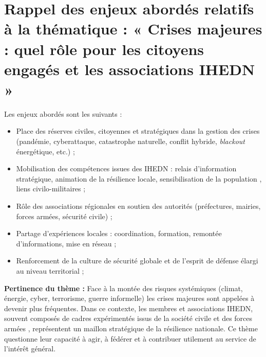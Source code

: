 \documentclass[12pt,a4paper]{article}
\begin{document}
\newpage

\section{Rappel des enjeux abordés relatifs à la thématique : « Crises majeures : quel rôle pour les citoyens engagés et les associations IHEDN »}

Les enjeux abordés sont les suivants :

\begin{itemize}
\item Place des réserves civiles, citoyennes et stratégiques dans la gestion des crises (pandémie, cyberattaque, catastrophe naturelle, conflit hybride, \textit{blackout} énergétique, etc.) ;
\item Mobilisation  des compétences issues des IHEDN : relais d'information stratégique, animation de la résilience locale, sensibilisation de la population , liens civilo-militaires ;
\item Rôle des associations régionales en soutien des autorités (préfectures, mairies, forces armées, sécurité civile) ;
\item Partage d'expériences locales : coordination, formation, remontée d'informations, mise en réseau  ;
\item Renforcement de la culture de sécurité globale et de l'esprit de défense élargi au niveau territorial ;
\end{itemize}

\textbf{Pertinence du thème :} Face à la montée des risques systémiques (climat, énergie, cyber, terrorisme, guerre informelle) les crises majeures sont appelées à devenir plus fréquentes. Dans ce contexte, les membres et associations IHEDN, souvent composés de cadres expérimentés issus de la société civile et des forces armées , représentent un maillon stratégique de la résilience nationale. Ce thème questionne leur capacité à agir, à fédérer et à contribuer utilement au service de l'intérêt général.

\newpage
\end{document}
